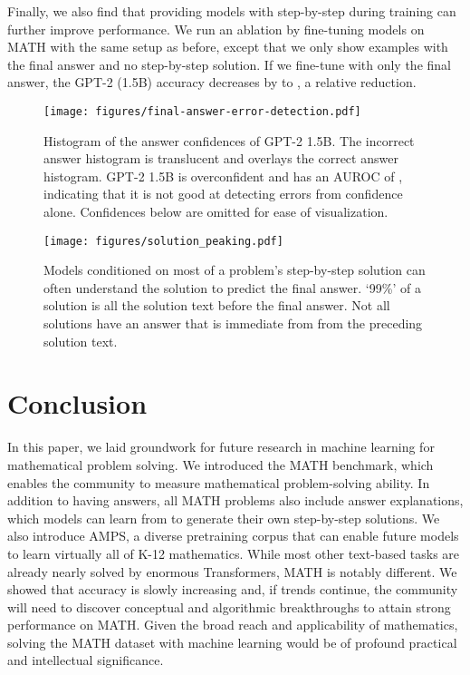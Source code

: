 \documentclass{article}
\begin{document}
Finally, we also find that providing models with step-by-step during training can further improve performance. We run an ablation by fine-tuning models on MATH with the same setup as before, except that we only show examples with the final answer and no step-by-step solution. If we fine-tune with only the final answer, the GPT-2 (1.5B) accuracy decreases by  to , a  relative reduction. 











\begin{figure}
\vspace{-20pt}
\begin{minipage}{.49\textwidth}
    \centering
    \texttt{[image: figures/final-answer-error-detection.pdf]}
    \caption{Histogram of the answer confidences of GPT-2 1.5B. The incorrect answer histogram is translucent and overlays the correct answer histogram. GPT-2 1.5B is overconfident and has an AUROC of , indicating that it is not good at detecting errors from confidence alone. Confidences below  are omitted for ease of visualization.}
    \label{fig:errordetection}
\end{minipage}\hfill \begin{minipage}{.49\textwidth}
    \centering
    \texttt{[image: figures/solution\_peaking.pdf]}
    \caption{Models conditioned on most of a problem's step-by-step solution can often understand the solution to predict the final answer. `99\%' of a solution is all the solution text before the final answer. Not all solutions have an answer that is immediate from from the preceding solution text.}
    \label{fig:peaking}
\end{minipage}
\vspace{-7pt}
\end{figure} \section{Conclusion}
In this paper, we laid groundwork for future research in machine learning for mathematical problem solving. We introduced the MATH benchmark, which enables the community to measure mathematical problem-solving ability. In addition to having answers, all MATH problems also include answer explanations, which models can learn from to generate their own step-by-step solutions. We also introduce AMPS, a diverse pretraining corpus that can enable future models to learn virtually all of K-12 mathematics. While most other text-based tasks are already nearly solved by enormous Transformers, MATH is notably different. We showed that accuracy is slowly increasing and, if trends continue, the community will need to discover conceptual and algorithmic breakthroughs to attain strong performance on MATH. Given the broad reach and applicability of mathematics, solving the MATH dataset with machine learning would be of profound practical and intellectual significance.
\end{document}
